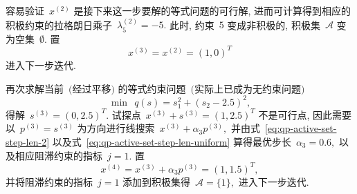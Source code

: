 \begin{exam}
容易验证~${x}^{(2)}$ 是接下来这一步要解的等式问题的可行解, 进而可计算得到相应的积极约束的拉格朗日乘子~$\lambda_5^{(2)} = -5.$ 此时, 约束~$5$ 变成非积极的, 积极集~$\mathcal{A}$ 变为空集~$\emptyset.$ 置
\begin{equation*}
{x}^{(3)} = {x}^{(2)} = (1, 0)^T
\end{equation*}
进入下一步迭代.

再次求解当前~$($经过平移$)$ 的等式约束问题~$($实际上已成为无约束问题$)$
\begin{equation*}
\min ~~ q({s}) = s_1^2 + (s_2 - 2.5)^2,
\end{equation*}
得解~${s}^{(3)} = (0, 2.5)^T.$ 试探点~${x}^{(3)} + {s}^{(3)} = (1, 2.5)^T$ 不是可行点,
因此需要以~${p}^{(3)} = {s}^{(3)}$ 为方向进行线搜索~${x}^{(3)} + \alpha_3 {p}^{(3)},$
并由式~\eqref{eq:qp-active-set-step-len-2} 以及式~\eqref{eq:qp-active-set-step-len-uniform} 算得最优步长~$\alpha_3 = 0.6,$ 以及相应阻滞约束的指标~$j = 1.$ 置
\begin{equation*}
{x}^{(4)} = {x}^{(3)} + \alpha_3 {p}^{(3)} = (1, 1.5)^T,
\end{equation*}
并将阻滞约束的指标~$j = 1$ 添加到积极集得~$\mathcal{A} = \{ 1 \},$ 进入下一步迭代.


\end{exam}
